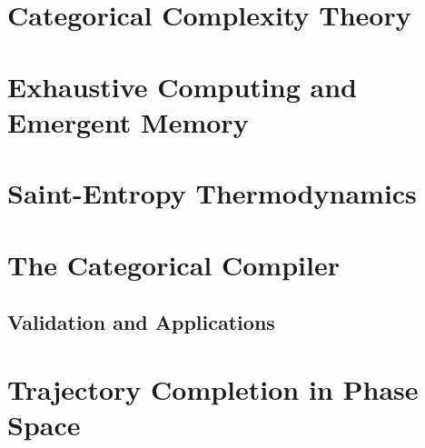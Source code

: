 \section{Categorical Complexity Theory}
\label{sec:complexity}



\section{Exhaustive Computing and Emergent Memory}
\label{sec:exhaustive}



\section{Saint-Entropy Thermodynamics}
\label{sec:stellas}



\section{The Categorical Compiler}
\label{sec:compiler}




\subsection{Validation and Applications}
\label{part:validation}

\section{Trajectory Completion in Phase Space}
\label{sec:trajectory}



